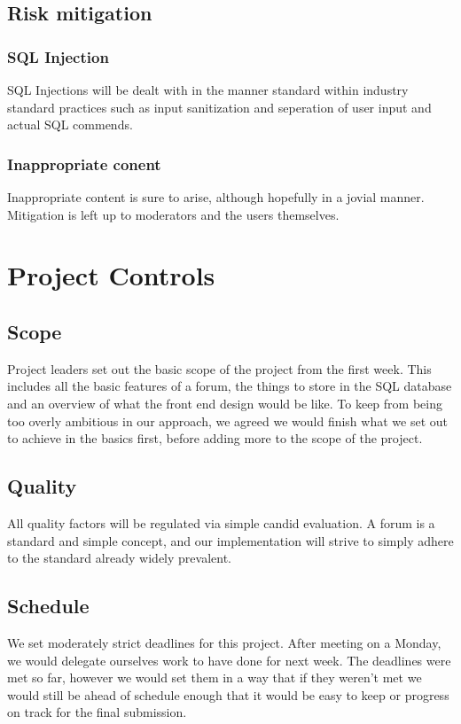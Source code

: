 \documentclass[a4paper, 12pt]{article}
\begin{document}
		\subsection{Risk mitigation}
			\subsubsection{SQL Injection}
				SQL Injections will be dealt with in the manner standard within industry standard practices such as input sanitization
				and seperation of user input and actual SQL commends. 
			\subsubsection{Inappropriate conent}
				Inappropriate content is sure to arise, although hopefully in a jovial manner. Mitigation is left up to moderators and the
				users themselves.

	\newpage
	\section{Project Controls}
		\subsection{Scope}
			\par Project leaders set out the basic scope of the project from the first week. This includes all the basic 
			features of a forum, the things to store in the SQL database and an overview of what the front end design would be 
			like. To keep from being too overly ambitious in our approach, we agreed we would finish what we set out to 
			achieve in the basics first, before adding more to the scope of the project. 

		\subsection{Quality}
			\par All quality factors will be regulated via simple candid evaluation. A forum is a standard and simple concept, and
			our implementation will strive to simply adhere to the standard already widely prevalent.
		\subsection{Schedule}
			\par We set moderately strict deadlines for this project. After meeting on a Monday, 
			we would delegate ourselves work to have done for next week. The deadlines were met so 
			far, however we would set them in a way that if they weren’t met we would still be ahead of 
			schedule enough that it would be easy to keep or progress on track for the final submission.
\end{document}
